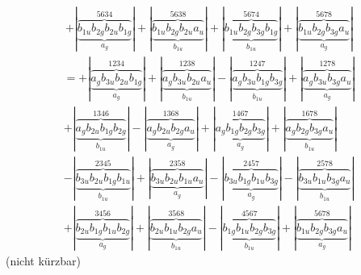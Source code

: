 \documentclass{article}
\begin{document}
\begin{multline*}
+\left|\underbrace{\overbrace{b_{1u} b_{2g} b_{2u} b_{1g}}^{5 6 3 4}}_{a_{g}}\right|+\left|\underbrace{\overbrace{b_{1u} b_{2g} b_{2u} a_{u}}^{5 6 3 8}}_{b_{1u}}\right|+\left|\underbrace{\overbrace{b_{1u} b_{2g} b_{3g} b_{1g}}^{5 6 7 4}}_{b_{1u}}\right|+\left|\underbrace{\overbrace{b_{1u} b_{2g} b_{3g} a_{u}}^{5 6 7 8}}_{a_{g}}\right|
\end{multline*}\begin{multline*}
=+\left|\underbrace{\overbrace{a_{g} b_{3u} b_{2u} b_{1g}}^{1 2 3 4}}_{a_{g}}\right|+\left|\underbrace{\overbrace{a_{g} b_{3u} b_{2u} a_{u}}^{1 2 3 8}}_{b_{1u}}\right|-\left|\underbrace{\overbrace{a_{g} b_{3u} b_{1g} b_{3g}}^{1 2 4 7}}_{b_{1u}}\right|+\left|\underbrace{\overbrace{a_{g} b_{3u} b_{3g} a_{u}}^{1 2 7 8}}_{a_{g}}\right|\\
+\left|\underbrace{\overbrace{a_{g} b_{2u} b_{1g} b_{2g}}^{1 3 4 6}}_{b_{1u}}\right|-\left|\underbrace{\overbrace{a_{g} b_{2u} b_{2g} a_{u}}^{1 3 6 8}}_{a_{g}}\right|+\left|\underbrace{\overbrace{a_{g} b_{1g} b_{2g} b_{3g}}^{1 4 6 7}}_{a_{g}}\right|+\left|\underbrace{\overbrace{a_{g} b_{2g} b_{3g} a_{u}}^{1 6 7 8}}_{b_{1u}}\right|\\
-\left|\underbrace{\overbrace{b_{3u} b_{2u} b_{1g} b_{1u}}^{2 3 4 5}}_{b_{1u}}\right|+\left|\underbrace{\overbrace{b_{3u} b_{2u} b_{1u} a_{u}}^{2 3 5 8}}_{a_{g}}\right|-\left|\underbrace{\overbrace{b_{3u} b_{1g} b_{1u} b_{3g}}^{2 4 5 7}}_{a_{g}}\right|-\left|\underbrace{\overbrace{b_{3u} b_{1u} b_{3g} a_{u}}^{2 5 7 8}}_{b_{1u}}\right|\\
+\left|\underbrace{\overbrace{b_{2u} b_{1g} b_{1u} b_{2g}}^{3 4 5 6}}_{a_{g}}\right|+\left|\underbrace{\overbrace{b_{2u} b_{1u} b_{2g} a_{u}}^{3 5 6 8}}_{b_{1u}}\right|-\left|\underbrace{\overbrace{b_{1g} b_{1u} b_{2g} b_{3g}}^{4 5 6 7}}_{b_{1u}}\right|+\left|\underbrace{\overbrace{b_{1u} b_{2g} b_{3g} a_{u}}^{5 6 7 8}}_{a_{g}}\right|
\end{multline*}(nicht kürzbar)\\ \\
\vspace{0.5cm}
\end{document}
